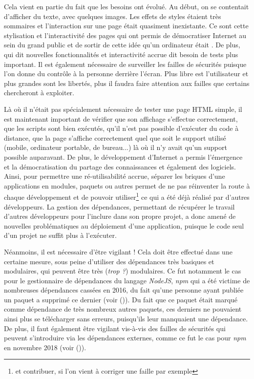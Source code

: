 Cela vient en partie du fait que les besoins ont évolué. Au début, on se contentait d'afficher du texte, avec quelques images. Les effets de styles étaient très sommaires et l'interaction sur une page était quasiment inexistante. Ce sont cette stylisation et l'interactivité des pages qui ont permis de démocratiser Internet au sein du grand public et de sortir de cette idée qu'un ordinateur était . De plus, qui dit nouvelles fonctionnalités et interactivité accrue dit besoin de tests plus important. Il est également nécessaire de surveiller les failles de sécurités puisque l'on donne du contrôle à la personne derrière l'écran. Plus libre est l'utilisateur et plus grandes sont les libertés, plus il faudra faire attention aux failles que certains chercheront à exploiter.

Là où il n'était pas spécialement nécessaire de tester une page \gls{HTML} simple, il est maintenant important de vérifier que son affichage s'effectue correctement, que les scripts sont bien exécutés, qu'il n'est pas possible d'exécuter du code à distance, que la page s'affiche correctement quel que soit le support utilisé (mobile, ordinateur portable, de bureau...) là où il n'y avait qu'un support possible auparavant. De plus, le développement d'Internet a permis l'émergence et la démocratisation du partage des connaissances et également des logiciels. Ainsi, pour permettre une ré-utilisabilité accrue, séparer les briques d'une applications en modules, paquets ou autres permet de ne pas réinventer la route à chaque développement et de pouvoir utiliser\footnote{et contribuer, si l'on vient à corriger une faille par exemple} ce qui a été déjà réalisé par d'autres développeurs. La gestion des dépendances, permettant de récupérer le travail d'autres développeurs pour l'inclure dans son propre projet, a donc amené de nouvelles problématiques au déploiement d'une application, puisque le code seul d'un projet ne suffit plus à l'exécuter. 

Néanmoins, il est nécessaire d'être vigilant ! Cela doit être effectué dans une certaine mesure, sous peine d'utiliser des dépendances très basiques et modulaires, qui peuvent être très (\emph{trop ?}) modulaires. Ce fut notamment le cas pour le gestionnaire de dépendances du langage \emph{NodeJS}, \emph{npm} qui a été victime de nombreuses dépendances cassées en 2016, du fait qu'une personne ayant publiée un paquet a supprimé ce dernier (voir  \cite{npm-missing-deps} ()). Du fait que ce paquet était marqué comme dépendance de très nombreux autres paquets, ces derniers ne pouvaient ainsi plus se télécharger sans erreurs, puisqu'ils leur manquaient une dépendance. De plus, il faut également être vigilant vis-à-vis des failles de sécurités qui peuvent s'introduire via les dépendances externes, comme ce fut le cas pour \emph{npm} en novembre 2018 (voir  \cite{npm-faille} ()).

